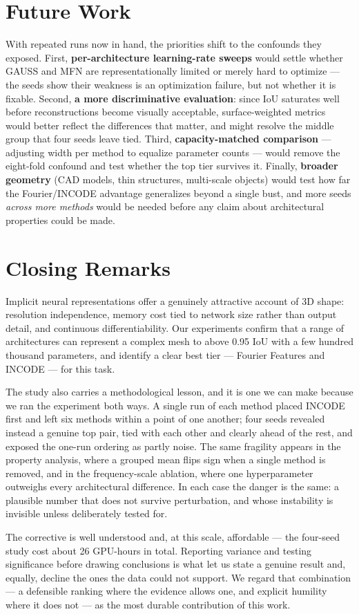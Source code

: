 \section{Future Work}

With repeated runs now in hand, the priorities shift to the confounds they exposed. First, \textbf{per-architecture learning-rate sweeps} would settle whether GAUSS and MFN are representationally limited or merely hard to optimize --- the seeds show their weakness is an optimization failure, but not whether it is fixable. Second, \textbf{a more discriminative evaluation}: since IoU saturates well before reconstructions become visually acceptable, surface-weighted metrics would better reflect the differences that matter, and might resolve the middle group that four seeds leave tied. Third, \textbf{capacity-matched comparison} --- adjusting width per method to equalize parameter counts --- would remove the eight-fold confound and test whether the top tier survives it. Finally, \textbf{broader geometry} (CAD models, thin structures, multi-scale objects) would test how far the Fourier/INCODE advantage generalizes beyond a single bust, and more seeds \emph{across more methods} would be needed before any claim about architectural properties could be made.

\section{Closing Remarks}

Implicit neural representations offer a genuinely attractive account of 3D shape: resolution independence, memory cost tied to network size rather than output detail, and continuous differentiability. Our experiments confirm that a range of architectures can represent a complex mesh to above 0.95 IoU with a few hundred thousand parameters, and identify a clear best tier --- Fourier Features and INCODE --- for this task.

The study also carries a methodological lesson, and it is one we can make because we ran the experiment both ways. A single run of each method placed INCODE first and left six methods within a point of one another; four seeds revealed instead a genuine top pair, tied with each other and clearly ahead of the rest, and exposed the one-run ordering as partly noise. The same fragility appears in the property analysis, where a grouped mean flips sign when a single method is removed, and in the frequency-scale ablation, where one hyperparameter outweighs every architectural difference. In each case the danger is the same: a plausible number that does not survive perturbation, and whose instability is invisible unless deliberately tested for.

The corrective is well understood and, at this scale, affordable --- the four-seed study cost about 26 GPU-hours in total. Reporting variance and testing significance before drawing conclusions is what let us state a genuine result and, equally, decline the ones the data could not support. We regard that combination --- a defensible ranking where the evidence allows one, and explicit humility where it does not --- as the most durable contribution of this work.
